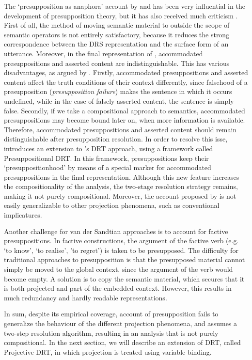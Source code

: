 The `presupposition as anaphora' account by \citet{sandt1992presupposition}
and \citet{geurts1999presuppositions} has been very influential in the
development of presupposition theory, but it has also received much
criticism \citep[see, e.g.,][]{beaver2002presupposition}. First of all, the
method of moving semantic material to outside the scope of semantic
operators is not entirely satisfactory, because it reduces the strong
correspondence between the DRS representation and the surface form of an
utterance.  Moreover, in the final representation of
\citet{sandt1992presupposition}, accommodated presuppositions and asserted
content are indistinguishable. This has various disadvantages, as argued by
\citet{kracht1994logic}. Firstly, accommodated presuppositions and asserted
content affect the truth conditions of their context differently, since
falsehood of a presupposition (\emph{presupposition failure}) makes the
sentence in which it occurs undefined, while in the case of falsely asserted
content, the sentence is simply false. Secondly, if we take a compositional
approach to semantics, accommodated presuppositions may become bound later
on, when more information is available. Therefore, accommodated
presuppositions and asserted content should remain distinguishable after
presupposition resolution. In order to resolve this isse,
\citet{krahmer1998presupposition} introduces an extension to
\citeauthor{sandt1992presupposition}'s DRT approach, using a framework
called Presuppositional DRT. In this framework, presuppositions keep their
`presuppositionhood' by means of a special marker for accommodated
presuppositions in the final representation. Although this new feature
increases the compositionality of the analysis, the two-stage resolution
strategy remains, making it not purely compositional.  Moreover, the account
proposed by \citet{krahmer1998presupposition} is not easily generalizable to
other projection phenomena, such as \cites{potts2005logic} conventional
implicatures.

Another challenge for van der Sandtian approaches is to account for factive
presuppositions. In factive constructions, the argument of the factive verb
(e.g. `to know', `to realise', 'to regret') is taken to be presupposed. The
difficulty for traditional approaches to presupposition is that the
presupposed material cannot simply be moved to the global context, since the
argument of the verb would become empty. A solution is to copy the semantic
material, which secures that it is both projected and part of the embedded
context. However, this results in much redundancy and hardly readable
representations.

In sum, despite its empirical coverage, \cites{sandt1992presupposition}
account of presupposition fails to generalize the behaviour of the different
projection phenomena, and assumes a two-step resolution algorithm, resulting
in an analysis that is not purely compositional. In the next section, we
will describe an extension of DRT, called Projective DRT, in which
projection is treated using variable binding.
